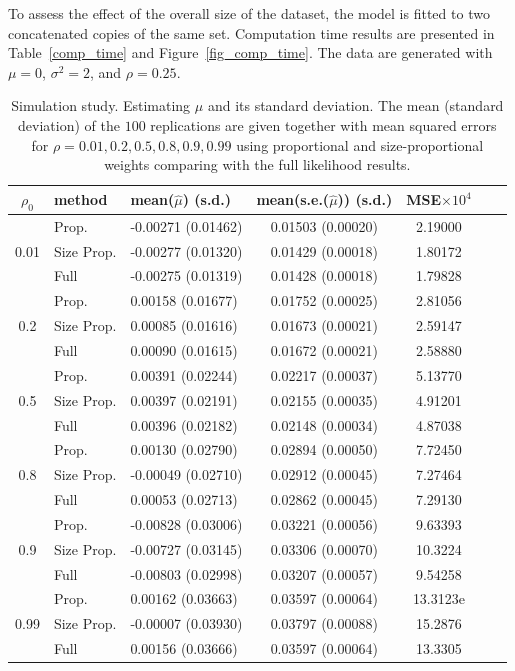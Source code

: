 \documentclass[11pt,a5paper,twoside]{book}
\begin{document}
{To assess the effect of the overall size of the dataset, the model is fitted to two concatenated copies of the same set. Computation time results are presented in Table~\ref{comp_time} and Figure~\ref{fig_comp_time}.  The data are generated with $\mu=0$, $\sigma^2=2$, and $\rho=0.25$.
\begin{table}[ht]
\centering
\caption[Simulation study. Estimating $\mu$ and its standard deviation]{Simulation study. Estimating $\mu$ and its standard deviation. The mean (standard deviation) of the $100$ replications are given together with mean squared errors for $\rho=0.01,0.2,0.5,0.8,0.9,0.99$ using proportional and size-proportional weights comparing with the full likelihood results.}
\label{sim_mu}

\vspace*{2mm}

\begin{tabular}{cllcccc}
\hline\hline
$\rho_0$&method & mean($\widehat{\mu}$) (s.d.)  & mean(s.e.($\widehat{\mu}$)) (s.d.)  & MSE$\times 10^4$ \\
  \hline
  &Prop. & -0.00271 (0.01462) & 0.01503 (0.00020) & 2.19000 \\
0.01  &Size Prop. & -0.00277 (0.01320) & 0.01429 (0.00018) & 1.80172 \\
  &Full & -0.00275 (0.01319) & 0.01428 (0.00018) & 1.79828 \\ \hline
  &Prop. & 0.00158 (0.01677) & 0.01752 (0.00025) & 2.81056 \\
0.2   &Size Prop. & 0.00085 (0.01616) & 0.01673 (0.00021) & 2.59147 \\
  &Full & 0.00090 (0.01615) & 0.01672 (0.00021) & 2.58880 \\ \hline
  &Prop. & 0.00391 (0.02244) & 0.02217 (0.00037) & 5.13770 \\
0.5   &Size Prop. & 0.00397 (0.02191) & 0.02155 (0.00035) & 4.91201 \\
  &Full & 0.00396 (0.02182) & 0.02148 (0.00034) & 4.87038 \\ \hline
  &Prop. & 0.00130 (0.02790) & 0.02894 (0.00050) & 7.72450 \\
0.8   &Size Prop. & -0.00049 (0.02710) & 0.02912 (0.00045) & 7.27464 \\
  &Full & 0.00053 (0.02713) & 0.02862 (0.00045) & 7.29130 \\ \hline
  &Prop. & -0.00828 (0.03006) & 0.03221 (0.00056)&  9.63393 \\
0.9   &Size Prop. & -0.00727 (0.03145) & 0.03306 (0.00070) & 10.3224 \\
  &Full & -0.00803 (0.02998) & 0.03207 (0.00057) & 9.54258 \\ \hline
  &Prop. & 0.00162 (0.03663) & 0.03597 (0.00064) & 13.3123e \\
0.99   &Size Prop. & -0.00007 (0.03930) & 0.03797 (0.00088) & 15.2876 \\
  &Full & 0.00156 (0.03666) & 0.03597 (0.00064) &  13.3305 \\
   \hline
\hline
\end{tabular}
\end{table}


}
\end{document}

